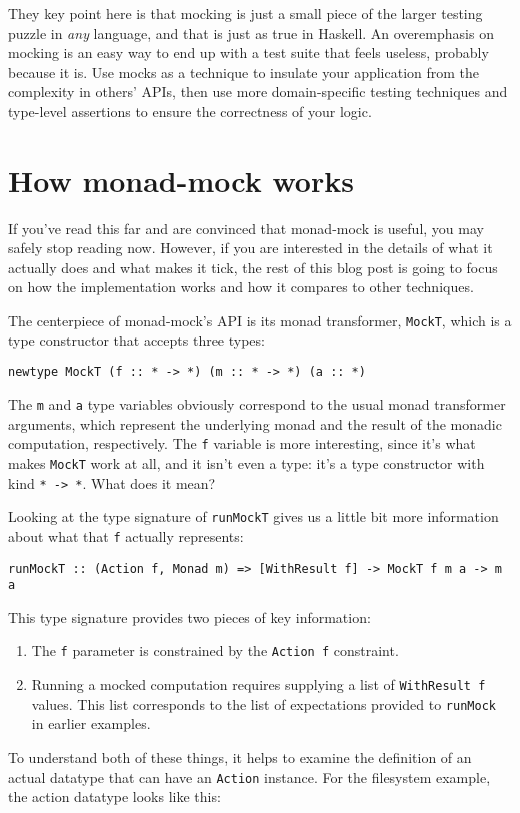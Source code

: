 They key point here is that mocking is just a small piece of the larger
testing puzzle in \emph{any} language, and that is just as true in
Haskell. An overemphasis on mocking is an easy way to end up with a test
suite that feels useless, probably because it is. Use mocks as a
technique to insulate your application from the complexity in others'
APIs, then use more domain-specific testing techniques and type-level
assertions to ensure the correctness of your logic.

\hypertarget{how-monad-mock-works}{%
\section{How monad-mock works}\label{how-monad-mock-works}}

If you've read this far and are convinced that monad-mock is useful, you
may safely stop reading now. However, if you are interested in the
details of what it actually does and what makes it tick, the rest of
this blog post is going to focus on how the implementation works and how
it compares to other techniques.

The centerpiece of monad-mock's API is its monad transformer,
\texttt{MockT}, which is a type constructor that accepts three types:

\begin{verbatim}
newtype MockT (f :: * -> *) (m :: * -> *) (a :: *)
\end{verbatim}
The \texttt{m} and \texttt{a} type variables obviously correspond to the
usual monad transformer arguments, which represent the underlying monad
and the result of the monadic computation, respectively. The \texttt{f}
variable is more interesting, since it's what makes \texttt{MockT} work
at all, and it isn't even a type: it's a type constructor with kind
\texttt{*\ -\textgreater{}\ *}. What does it mean?

Looking at the type signature of \texttt{runMockT} gives us a little bit
more information about what that \texttt{f} actually represents:

\begin{verbatim}
runMockT :: (Action f, Monad m) => [WithResult f] -> MockT f m a -> m a
\end{verbatim}
This type signature provides two pieces of key information:

\begin{enumerate}
\item
  The \texttt{f} parameter is constrained by the \texttt{Action\ f}
  constraint.
\item
  Running a mocked computation requires supplying a list of
  \texttt{WithResult\ f} values. This list corresponds to the list of
  expectations provided to \texttt{runMock} in earlier examples.
\end{enumerate}
To understand both of these things, it helps to examine the definition
of an actual datatype that can have an \texttt{Action} instance. For the
filesystem example, the action datatype looks like this:

